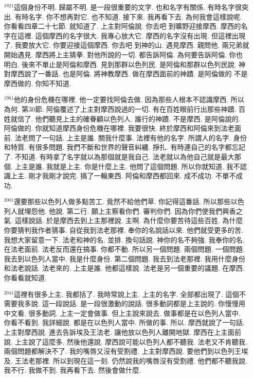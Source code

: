 \documentclass{book}
\begin{document}
$^{1921}$這個身份不明.
歸屬不明.
是一段很重要的文字.
也和名字有關係.
有時名字很突出.
有時名字.
你不想再對它.
也不知道.
接下來.
我再看下去.
為何我會這樣說呢.
你看看四章二十七節.
就知道了.
上主對阿倫說.
你去吧 到曠野迎接摩西.
摩西的名字在這裡.
這個摩西的名字很大.
我專心放大它.
摩西的名字沒有出現.
但這裡出現了.
我要放大它.
你要迎接這個摩西.
你去吧 到神的山.
遇見摩西.
親問他.
兩兄弟就開始遇見.
摩西將上主猜拳.
對他所說的一切.
都告訴阿倫.
為何要告訴阿倫.
你也明白.
後來不單止是阿倫和摩西.
見到那群以色列民.
是阿倫和那群以色列民說.
神對摩西說了一番話.
也是阿倫.
將神教摩西.
做在摩西面前的神蹟.
是阿倫做的 不是摩西做的.
你知不知道.

$^{1961}$他的身份危機在哪裡.
他一定要找阿倫去做.
因為那些人根本不認識摩西.
所以為何.
第30節.
阿倫覆述了上主對摩西說過的一切.
有在百姓眼前行出那些神蹟.
百姓就信了.
他們聽見上主的確眷顧以色列人.
誰行的神蹟.
不是摩西.
是阿倫說的.
阿倫做的.
你就知道摩西身份危機在哪裡.
我要很快.
終於摩西和阿倫來到法老面前.
法老問了一句話.
上主是誰.
關我什麼事.
法裡有他的名字.
所謂人的名字.
身份和特質.
有很多問題.
我們不斷和世界的聲音糾纏.
掙扎.
有時連自己的名字都忘記了.
不知道.
有時拿了名字就以為那個就是我自己.
法老就以為他自己就是最大那個.
上主是誰.
我就是上主.
你是什麼上主.
他問了這個問題.
所以你就知道.
我不認識上主.
剛才我剛才說完.
搞了一輪東西.
阿倫和摩西都回來.
成不成功.
不單不成功.

$^{2001}$還要那些以色列人做多點苦工.
竟然不給他們草.
你記得這番話.
所以那些以色列人就埋怨他.
他說.
第二行.
願上主察看你們.
審判你們.
因為你們使我們興香之氣.
這樣說話.
於是摩西去到上主那裡說.
主啊.
為什麼你要苦待這些百姓.
為什麼你要猜判我作者猜事.
自從我到法老那裡.
奉你的名說話以來.
他們就受更多的苦.
我想大家留意一下.
法老和神的名.
並排.
換句話說.
神你的名不夠強.
我奉你的名.
在法老面前.
法老反而還在搞事.
你都不動.
所以另一個問題.
兩個問題.
一個問題.
我去到以色列人當中.
我是什麼身份.
第二個問題.
我去到法老那裡.
我用什麼身份和法老說話.
法老來的.
上主是誰.
他都這樣說.
法老是另一個重要的議題.
在摩西.
你看看就知道.

$^{2041}$這裡有很多上主.
我都括了.
我時常說上主.
上主的名字.
全部都出現了.
這個不需要我多說.
這一段說話.
是一段很激動的說話.
很多動詞都是上主說的.
你慢慢用中文看.
很多動詞.
上主一定會做事.
但上主說來說去.
做事都是在以色列人當中.
你看不看到.
我詳細說.
都是在以色列人當中.
所做的事.
所以.
摩西就說了一句話.
上主對摩西說.
進去告訴埃及王法老.
讓他放以色列人離開地獄.
摩西在上主面前說.
上主說了這麼多.
然後他還說.
摩西說可能以色列人都不聽我.
法老又不肯聽我.
兩個問題都解決不了.
我的嘴唇又沒有受割禮.
上主對摩西說.
要他們到以色列王埃及.
王法老那裡.
所以到現在這一刻.
仍然說我的嘴唇沒有受割禮.
他們都不聽我說.
我不行.
我做不到.
我再看下去.
然後會做什麼.
\end{document}
